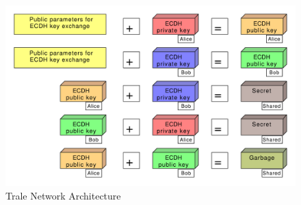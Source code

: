 \begin{figure}[H]
    \centering
    \includegraphics[width=1.0\textwidth]{./graphics/encryptionPattern.pdf}
    \caption{Trale Network Architecture}
    \label{fig:figure46}
\end{figure}


